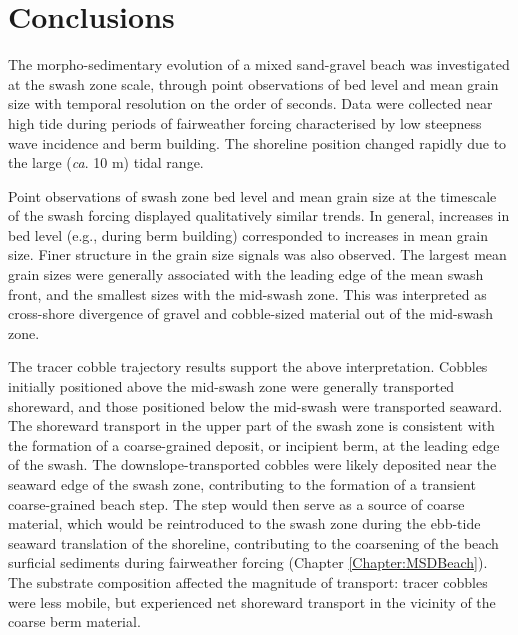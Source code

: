 
\section{Conclusions}

The morpho-sedimentary evolution of a mixed sand-gravel beach was investigated at the swash zone scale, through point observations of bed level and mean grain size with temporal resolution on the order of seconds. Data were collected near high tide during periods of fairweather forcing characterised by low steepness wave incidence and berm building. The shoreline position changed rapidly due to the large (\textit{ca}. 10 m) tidal range.

Point observations of swash zone bed level and mean grain size at the timescale of the swash forcing displayed qualitatively similar trends. In general, increases in bed level (e.g., during berm building) corresponded to increases in mean grain size. Finer structure in the grain size signals was also observed. The largest mean grain sizes were generally associated with the leading edge of the mean swash front, and the smallest sizes with the mid-swash zone. This was interpreted as cross-shore divergence of gravel and cobble-sized material out of the mid-swash zone.

The tracer cobble trajectory results support the above interpretation. Cobbles initially positioned above the mid-swash zone were generally transported shoreward, and those positioned below the mid-swash were transported seaward. The shoreward transport in the upper part of the swash zone is consistent with the formation of a coarse-grained deposit, or incipient berm, at the leading edge of the swash. The downslope-transported cobbles were likely deposited near the seaward edge of the swash zone, contributing to the formation of a transient coarse-grained beach step. The step would then serve as a source of coarse material, which would be reintroduced to the swash zone during the ebb-tide seaward translation of the shoreline, contributing to the coarsening of the beach surficial sediments during fairweather forcing (Chapter \ref{Chapter:MSDBeach}). The substrate composition affected the magnitude of transport: tracer cobbles were less mobile, but experienced net shoreward transport in the vicinity of the coarse berm material. 


